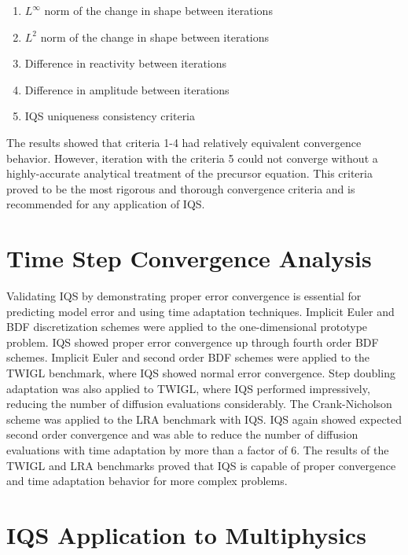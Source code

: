 \begin{enumerate}
\item $L^\infty$ norm of the change in shape between iterations
\item $L^2$ norm of the change in shape between iterations
\item Difference in reactivity between iterations
\item Difference in amplitude between iterations
\item IQS uniqueness consistency criteria
\end{enumerate}

The results showed that criteria 1-4 had relatively equivalent convergence behavior. However, iteration with the criteria 5 could not converge without a highly-accurate analytical treatment of the precursor equation. This criteria proved to be the most rigorous and thorough convergence criteria and is recommended for any application of IQS.

\section{Time Step Convergence Analysis}

Validating IQS by demonstrating proper error convergence is essential for predicting model error and using time adaptation techniques. Implicit Euler and BDF discretization schemes were applied to the one-dimensional prototype problem. IQS showed proper error convergence up through fourth order BDF schemes. Implicit Euler and second order BDF schemes were applied to the TWIGL benchmark, where IQS showed normal error convergence. Step doubling adaptation was also applied to TWIGL, where IQS performed impressively, reducing the number of diffusion evaluations considerably. The Crank-Nicholson scheme was applied to the LRA benchmark with IQS. IQS again showed expected second order convergence and was able to reduce the number of diffusion evaluations with time adaptation by more than a factor of 6. The results of the TWIGL and LRA benchmarks proved that IQS is capable of proper convergence and time adaptation behavior for more complex problems.

\section{IQS Application to Multiphysics}

